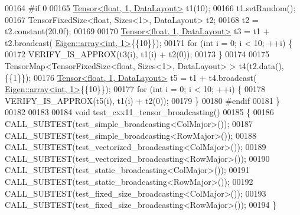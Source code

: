 \begin{DoxyCode}
00164 \textcolor{preprocessor}{#if 0}
00165   \hyperlink{class_eigen_1_1_tensor}{Tensor<float, 1, DataLayout>} t1(10);
00166   t1.setRandom();
00167   TensorFixedSize<float, Sizes<1>, DataLayout> t2;
00168   t2 = t2.constant(20.0f);
00169 
00170   \hyperlink{class_eigen_1_1_tensor}{Tensor<float, 1, DataLayout>} t3 = t1 + t2.broadcast(
      \hyperlink{class_eigen_1_1array}{Eigen::array<int, 1>}\{\{10\}\});
00171   \textcolor{keywordflow}{for} (\textcolor{keywordtype}{int} i = 0; i < 10; ++i) \{
00172     VERIFY\_IS\_APPROX(t3(i), t1(i) + t2(0));
00173   \}
00174 
00175   TensorMap<TensorFixedSize<float, Sizes<1>, DataLayout> > t4(t2.data(), \{\{1\}\});
00176   \hyperlink{class_eigen_1_1_tensor}{Tensor<float, 1, DataLayout>} t5 = t1 + t4.broadcast(
      \hyperlink{class_eigen_1_1array}{Eigen::array<int, 1>}\{\{10\}\});
00177   \textcolor{keywordflow}{for} (\textcolor{keywordtype}{int} i = 0; i < 10; ++i) \{
00178     VERIFY\_IS\_APPROX(t5(i), t1(i) + t2(0));
00179   \}
00180 \textcolor{preprocessor}{#endif}
00181 \}
00182 
00183 
00184 \textcolor{keywordtype}{void} test\_cxx11\_tensor\_broadcasting()
00185 \{
00186   CALL\_SUBTEST(test\_simple\_broadcasting<ColMajor>());
00187   CALL\_SUBTEST(test\_simple\_broadcasting<RowMajor>());
00188   CALL\_SUBTEST(test\_vectorized\_broadcasting<ColMajor>());
00189   CALL\_SUBTEST(test\_vectorized\_broadcasting<RowMajor>());
00190   CALL\_SUBTEST(test\_static\_broadcasting<ColMajor>());
00191   CALL\_SUBTEST(test\_static\_broadcasting<RowMajor>());
00192   CALL\_SUBTEST(test\_fixed\_size\_broadcasting<ColMajor>());
00193   CALL\_SUBTEST(test\_fixed\_size\_broadcasting<RowMajor>());
00194 \}
\end{DoxyCode}
